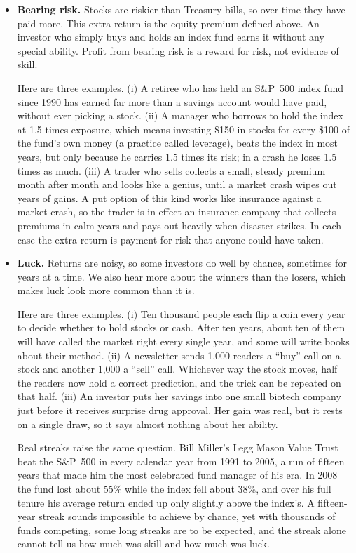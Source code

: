 \begin{itemize}
  \item \textbf{Bearing risk.} Stocks are riskier than Treasury bills, so over
  time they have paid more. This extra return is the equity premium defined
  above. An investor who simply buys and holds an index fund earns it without
  any special ability. Profit from bearing risk is a reward for risk, not
  evidence of skill.

  Here are three examples. (i) A retiree who has held an S\&P~500 index fund since
  1990 has earned far more than a savings account would have paid, without
  ever picking a stock. (ii) A manager who borrows to hold the index at
  1.5 times exposure, which means investing \$150 in stocks for every \$100
  of the fund's own money (a practice called leverage), beats the index in most years, but only because he
  carries 1.5 times its risk; in a crash he loses 1.5 times as much.
  (iii) A trader who sells   collects a small,
  steady premium month after month and looks like a genius, until a market
  crash wipes out years of gains. A put option of this kind works like
  insurance against a market crash, so the trader is in effect an insurance
  company that collects premiums in calm years and pays out heavily when
  disaster strikes. In each case the extra return is payment
  for risk that anyone could have taken.

  \item \textbf{Luck.} Returns are noisy, so some investors do well by
  chance, sometimes for years at a time. We also hear more about the winners
  than the losers, which makes luck look more common than it is.

  Here are three examples. (i) Ten thousand people each flip a coin every year to
  decide whether to hold stocks or cash. After ten years, about ten of them
  will have called the market right every single year, and some will write
  books about their method. (ii) A newsletter sends 1{,}000 readers a
  ``buy'' call on a stock and another 1{,}000 a ``sell'' call. Whichever way
  the stock moves, half the readers now hold a correct prediction, and the
  trick can be repeated on that half. (iii) An investor puts her savings into
  one small biotech company just before it receives surprise drug approval.
  Her gain was real, but it rests on a single draw, so it says almost nothing
  about her ability.

  Real streaks raise the same question. Bill Miller's Legg Mason Value Trust
  beat the S\&P~500 in every calendar year from 1991 to 2005, a run of fifteen
  years that made him the most celebrated fund manager of his era. In 2008
  the fund lost about 55\% while the index fell about 38\%, and over his full
  tenure his average return ended up only slightly above the index's. A
  fifteen-year streak sounds impossible to achieve by chance, yet with
  thousands of funds competing, some long streaks are to be expected, and
  the streak alone cannot tell us how much was skill and how much was luck.



\end{itemize}

